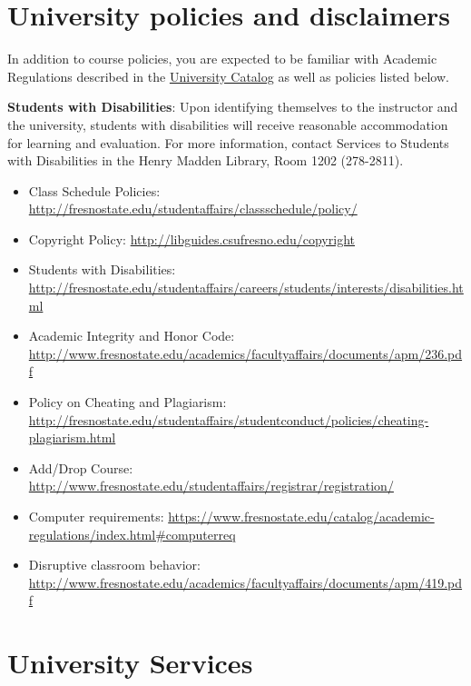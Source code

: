\hypertarget{university-policies-and-disclaimers}{%
\section{University policies and
disclaimers}\label{university-policies-and-disclaimers}}

In addition to course policies, you are expected to be familiar with
Academic Regulations described in the
\href{http://www.fresnostate.edu/catalog/academic-regulations/}{University
Catalog} as well as policies listed below.

\textbf{Students with Disabilities}: Upon identifying themselves to the
instructor and the university, students with disabilities will receive
reasonable accommodation for learning and evaluation. For more
information, contact Services to Students with Disabilities in the Henry
Madden Library, Room 1202 (278-2811).

\begin{itemize}
\tightlist
\item
  Class Schedule Policies:
  \url{http://fresnostate.edu/studentaffairs/classschedule/policy/}
\item
  Copyright Policy: \url{http://libguides.csufresno.edu/copyright}
\item
  Students with Disabilities:
  \url{http://fresnostate.edu/studentaffairs/careers/students/interests/disabilities.html}
\item
  Academic Integrity and Honor Code:
  \url{http://www.fresnostate.edu/academics/facultyaffairs/documents/apm/236.pdf}
\item
  Policy on Cheating and Plagiarism:
  \url{http://fresnostate.edu/studentaffairs/studentconduct/policies/cheating-plagiarism.html}
\item
  Add/Drop Course:
  \url{http://www.fresnostate.edu/studentaffairs/registrar/registration/}
\item
  Computer requirements:
  \url{https://www.fresnostate.edu/catalog/academic-regulations/index.html\#computerreq}
\item
  Disruptive classroom behavior:
  \url{http://www.fresnostate.edu/academics/facultyaffairs/documents/apm/419.pdf}
\end{itemize}

\hypertarget{university-services}{%
\section{University Services}\label{university-services}}


